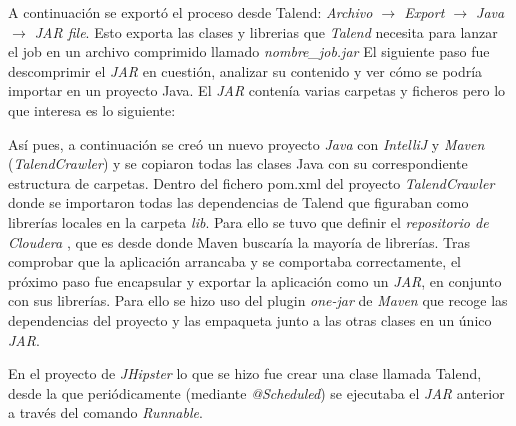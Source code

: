 A continuación se exportó el proceso desde Talend: 
\textit{Archivo $\rightarrow$ Export $\rightarrow$ Java $\rightarrow$ JAR file}. Esto exporta las clases y librerias que \textit{Talend} necesita para lanzar el job en un archivo comprimido llamado \textit{nombre\_job.jar}
El siguiente paso fue descomprimir el \textit{JAR} en cuestión, analizar su contenido y ver cómo se podría importar en un proyecto Java. El \textit{JAR} contenía varias carpetas y ficheros pero lo que interesa es lo siguiente:
\bigskip
\par 
{}
\bigskip
\par
Así pues, a continuación se creó un nuevo proyecto \textit{Java} con \textit{IntelliJ} y \textit{Maven} (\textit{TalendCrawler}) y se copiaron todas las clases Java con su correspondiente estructura de carpetas. Dentro del fichero pom.xml del proyecto \textit{TalendCrawler} donde se importaron todas las dependencias de Talend que figuraban como librerías locales en la carpeta \textit{lib}. Para ello se tuvo que definir el \textit{repositorio de Cloudera} \cite{cloudera}, que es desde donde Maven buscaría la mayoría de librerías. Tras comprobar que la aplicación arrancaba y se comportaba correctamente, el próximo paso fue encapsular y exportar la aplicación como un \textit{JAR}, en conjunto con sus librerías. Para ello se hizo uso del plugin \textit{one-jar} de \textit{Maven} que recoge las dependencias del proyecto y las empaqueta junto a las otras clases en un único \textit{JAR}.\par 

En el proyecto de \textit{JHipster} lo que se hizo fue crear una clase llamada Talend, desde la que periódicamente (mediante \textit{@Scheduled}) se ejecutaba el \textit{JAR} anterior a través del comando \textit{Runnable}. 

